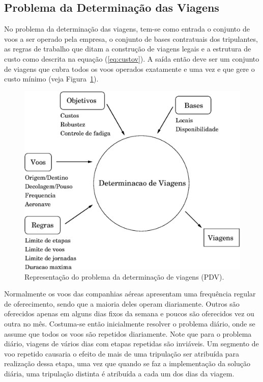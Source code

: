 \documentclass[12pt,a4paper]{article}
\begin{document}
\subsection{Problema da Determinação das Viagens}
\label{sec:viagens}

No problema da determinação das viagens, tem-se como entrada o conjunto de voos a ser operado pela
empresa, o conjunto de bases contratuais dos tripulantes, as regras de trabalho que ditam a
construção de viagens legais e a estrutura de custo como descrita na equação (\ref{eq:custov}). A
saída então deve ser um conjunto de viagens que cubra todos os voos operados exatamente e uma vez e
que gere o custo mínimo (veja Figura~\ref{fig:pdv}).

\begin{figure}[htbp]
	\begin{center}
		\includegraphics[scale=0.5]{fig/pdv.eps}
		\caption{Representação do problema da determinação de viagens (PDV).}
		\label{fig:pdv}
	\end{center}
\end{figure}

Normalmente os voos das companhias aéreas apresentam uma frequência regular de oferecimento, sendo
que a maioria deles operam diariamente. Outros são oferecidos apenas em alguns dias fixos da semana
e poucos são oferecidos vez ou outra no mês. Costuma-se então inicialmente resolver o problema
diário, onde se assume que todos os voos são repetidos diariamente. Note que para o problema diário,
viagens de vários dias com etapas repetidas são inviáveis. Um segmento de voo repetido causaria o
efeito de mais de uma tripulação ser atribuída para realização dessa etapa, uma vez que quando se
faz a implementação da solução diária, uma tripulação distinta é atribuída a cada um dos dias da
viagem.
\end{document}
